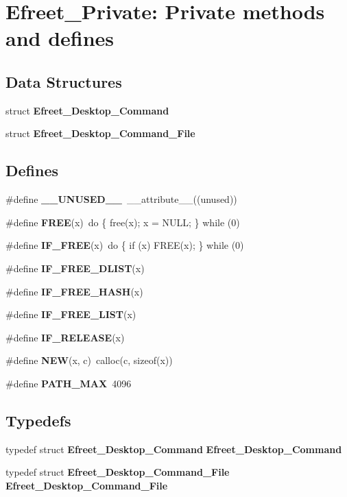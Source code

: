 \section{Efreet\_\-Private: Private methods and defines}
\label{group__Efreet__Private}


\subsection*{Data Structures}
\begin{CompactItemize}
\item 
struct {\bf Efreet\_\-Desktop\_\-Command}
\item 
struct {\bf Efreet\_\-Desktop\_\-Command\_\-File}
\end{CompactItemize}
\subsection*{Defines}
\begin{CompactItemize}
\item 
\#define {\bf \_\-\_\-UNUSED\_\-\_\-}~\_\-\_\-attribute\_\-\_\-((unused))
\item 
\#define {\bf FREE}(x)~do \{ free(x); x = NULL; \} while (0)
\item 
\#define {\bf IF\_\-FREE}(x)~do \{ if (x) FREE(x); \} while (0)
\item 
\#define {\bf IF\_\-FREE\_\-DLIST}(x)
\item 
\#define {\bf IF\_\-FREE\_\-HASH}(x)
\item 
\#define {\bf IF\_\-FREE\_\-LIST}(x)
\item 
\#define {\bf IF\_\-RELEASE}(x)
\item 
\#define {\bf NEW}(x, c)~calloc(c, sizeof(x))
\item 
\#define {\bf PATH\_\-MAX}~4096
\end{CompactItemize}
\subsection*{Typedefs}
\begin{CompactItemize}
\item 
typedef struct {\bf Efreet\_\-Desktop\_\-Command} {\bf Efreet\_\-Desktop\_\-Command}
\item 
typedef struct {\bf Efreet\_\-Desktop\_\-Command\_\-File} {\bf Efreet\_\-Desktop\_\-Command\_\-File}
\end{CompactItemize}
